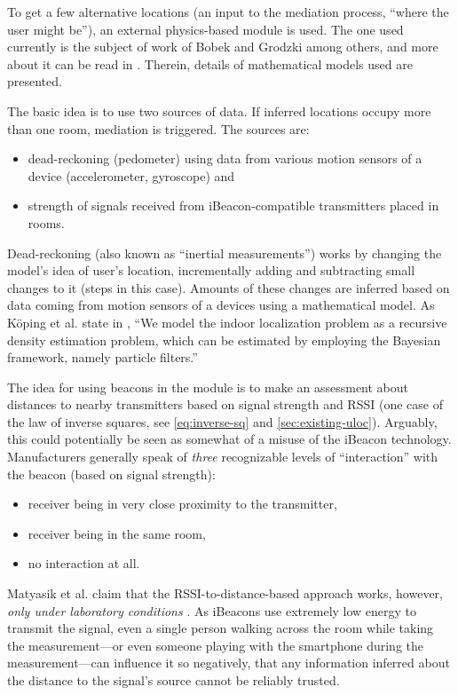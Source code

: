 To get a few alternative locations (an input to the mediation process, ``where the user might be''), an external physics-based module is used. The one used currently is the subject of work of Bobek and Grodzki among others, and more about it can be read in \cite{bobek2015indoor, Koeping2015indoor}. Therein, details of mathematical models used are presented.

The basic idea is to use two sources of data. If inferred locations occupy more than one room, mediation is triggered. The sources are:

\begin{itemize}
	\item dead-reckoning (pedometer) using data from various motion sensors of a device (accelerometer, gyroscope) and
	\item strength of signals received from iBeacon-compatible transmitters placed in rooms.
\end{itemize}

Dead-reckoning (also known as ``inertial measurements'') works by changing the model's idea of user's location, incrementally adding and subtracting small changes to it (steps in this case). Amounts of these changes are inferred based on data coming from motion sensors of a devices using a mathematical model. As Köping et al. state in \cite{Koeping2015indoor}, ``We model the indoor localization problem as a recursive density estimation problem, which can be estimated by employing the Bayesian framework, namely particle filters.''

The idea for using beacons in the module is to make an assessment about distances to nearby transmitters based on signal strength and RSSI (one case of the law of inverse squares, see \cref{eq:inverse-sq} and \cref{sec:existing-uloc}). Arguably, this could potentially be seen as somewhat of a misuse of the iBeacon technology. Manufacturers generally speak of \emph{three} recognizable levels of ``interaction'' with the beacon (based on signal strength): \begin{itemize}
 	\item receiver being in very close proximity to the transmitter,
 	\item receiver being in the same room,
 	\item no interaction at all.
 \end{itemize}

Matyasik et al. claim that the RSSI-to-distance-based approach works, however, \emph{only under laboratory conditions} \cite{Matyasik:iBeacon, Matyasik:iBeacon:slides}. As iBeacons use extremely low energy to transmit the signal, even a single person walking across the room while taking the measurement---or even someone playing with the smartphone during the measurement---can influence it so negatively, that any information inferred about the distance to the signal's source cannot be reliably trusted.

